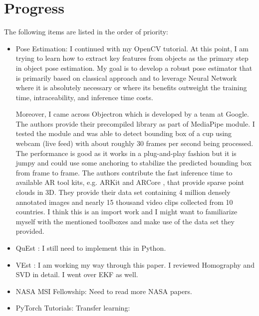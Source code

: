 \documentclass[11pt]{article}
\begin{document}
\section{Progress}
The following items are listed in the order of priority:
\begin{itemize}
      \item Pose Estimation: I continued with my OpenCV tutorial. At this point,
      I am trying to learn how to extract key features from objects as the primary
      step in object pose estimation. My goal is to develop a robust pose estimator
      that is primarily based on classical approach and to leverage Neural Network
      where it is absolutely necessary or where its benefits outweight the training
      time, intraceability, and inference time costs.

      Moreover, I came across Objectron \cite{ahmadyan2020objectron} which is
      developed by a team at Google. The authors provide their precompiled library
      as part of MediaPipe \cite{lugaresi2019mediapipe} module. I tested the module
      and was able to detect bounding box of a cup using webcam (live feed)
      with about roughly 30 frames per second being processed. The performance
      is good as it works in a plug-and-play fashion but it is jumpy and could
      use some anchoring to stabilize the predicted bounding box from frame to
      frame. The authors
      contribute the fast inference time to available AR tool kits, e.g. ARKit
      \cite{Augmente8:online} and
      ARCore \cite{Buildnew97:online}, that provide sparse point clouds in 3D.
      They provide their data set containing 4 million densely annotated
      images and nearly 15 thousand video clips collected from 10 countries.
      I think this is an import work and I might want to familiarize myself with
      the mentioned toolboxes and make use of the data set they provided.

      \item QuEst \cite{QuEst}: I still need to implement this in Python.

      \item VEst \cite{dani2009position}: I am working my way through this paper.
      I reviewed Homography and SVD in detail. I went over EKF as well.

      \item NASA MSI Fellowship: Need to read more NASA papers.

      \item PyTorch Tutorials: Transfer learning:



\end{itemize}
\end{document}

